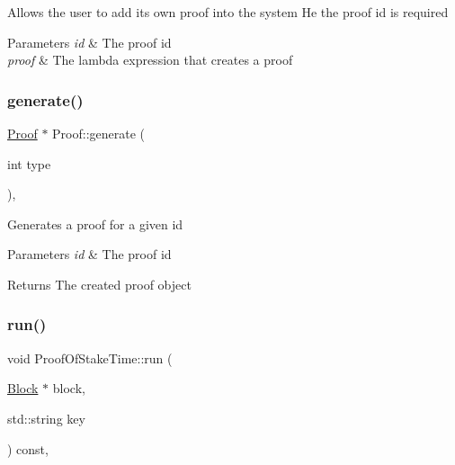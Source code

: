 Allows the user to add its own proof into the system He the proof id is required


\begin{DoxyParams}{Parameters}
{\em id} & The proof id \\
\hline
{\em proof} & The lambda expression that creates a proof \\
\hline
\end{DoxyParams}
\mbox{\label{classProof_a267f0f4587babb59884b5f280e2d54c8}} 
\subsubsection{\texorpdfstring{generate()}{generate()}}
{\footnotesize\ttfamily \mbox{\hyperlink{classProof}{Proof}} $\ast$ Proof\+::generate (\begin{DoxyParamCaption}\item[{int}]{type }\end{DoxyParamCaption})\hspace{0.3cm}{\ttfamily [static]}, {\ttfamily [inherited]}}

Generates a proof for a given id


\begin{DoxyParams}{Parameters}
{\em id} & The proof id \\
\hline
\end{DoxyParams}
\begin{DoxyReturn}{Returns}
The created proof object 
\end{DoxyReturn}
\mbox{\label{classProofOfStakeTime_a4081abb2bc76f8039995a73e9617086c}} 
\subsubsection{\texorpdfstring{run()}{run()}}
{\footnotesize\ttfamily void Proof\+Of\+Stake\+Time\+::run (\begin{DoxyParamCaption}\item[{\mbox{\hyperlink{classBlock}{Block}} $\ast$}]{block,  }\item[{std\+::string}]{key }\end{DoxyParamCaption}) const\hspace{0.3cm}{\ttfamily [override]}, {\ttfamily [virtual]}}

